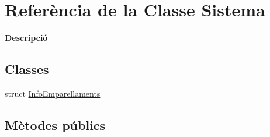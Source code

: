 \hypertarget{class_sistema}{\section{Referència de la Classe Sistema}
\label{class_sistema}
}


{\bfseries Descripció}  


\subsection*{Classes}
\begin{DoxyCompactItemize}
\item 
struct \hyperlink{struct_sistema_1_1_info_emparellaments}{Info\-Emparellaments}
\end{DoxyCompactItemize}
\subsection*{Mètodes públics}

